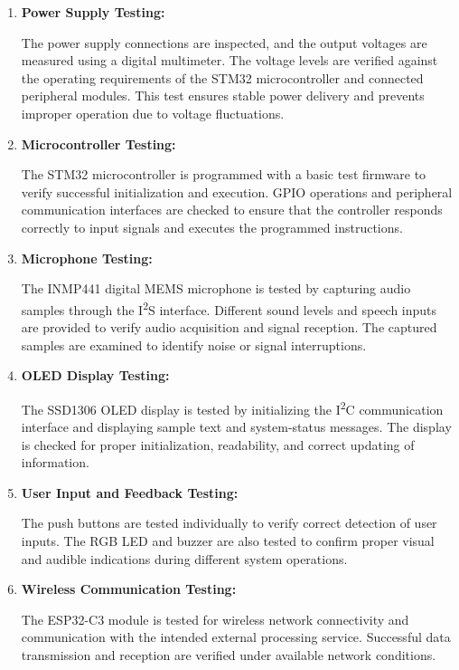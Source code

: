 \documentclass[a4paper,12pt,oneside]{report}
\begin{document}
\begin{enumerate}

    \item \textbf{Power Supply Testing:}

    The power supply connections are inspected, and the output
    voltages are measured using a digital multimeter. The voltage
    levels are verified against the operating requirements of
    the STM32 microcontroller and connected peripheral modules.
    This test ensures stable power delivery and prevents
    improper operation due to voltage fluctuations.

    \item \textbf{Microcontroller Testing:}

    The STM32 microcontroller is programmed with a basic test
    firmware to verify successful initialization and execution.
    GPIO operations and peripheral communication interfaces
    are checked to ensure that the controller responds correctly
    to input signals and executes the programmed instructions.

    \item \textbf{Microphone Testing:}

    The INMP441 digital MEMS microphone is tested by capturing
    audio samples through the I\textsuperscript{2}S interface.
    Different sound levels and speech inputs are provided to
    verify audio acquisition and signal reception. The captured
    samples are examined to identify noise or signal interruptions.

    \item \textbf{OLED Display Testing:}

    The SSD1306 OLED display is tested by initializing the
    I\textsuperscript{2}C communication interface and displaying
    sample text and system-status messages. The display is
    checked for proper initialization, readability, and
    correct updating of information.

    \item \textbf{User Input and Feedback Testing:}

    The push buttons are tested individually to verify correct
    detection of user inputs. The RGB LED and buzzer are also
    tested to confirm proper visual and audible indications
    during different system operations.

    \item \textbf{Wireless Communication Testing:}

    The ESP32-C3 module is tested for wireless network
    connectivity and communication with the intended external
    processing service. Successful data transmission and
    reception are verified under available network conditions.


\end{enumerate}
\end{document}

